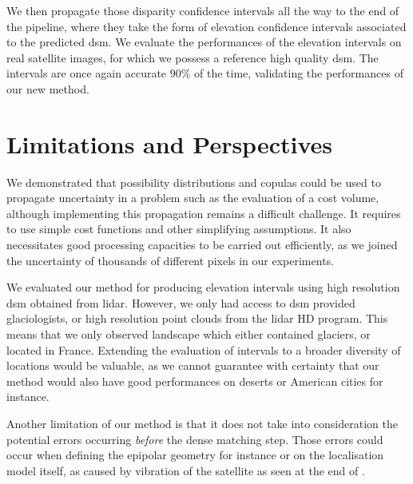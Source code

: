 We then propagate those disparity confidence intervals all the way to the end of the pipeline, where they take the form of elevation confidence intervals associated to the predicted \acrshort{dsm}. We evaluate the performances of the elevation intervals on real satellite images, for which we possess a reference high quality \acrshort{dsm}. The intervals are once again accurate $90\%$ of the time, validating the performances of our new method.

\section*{Limitations and Perspectives}
We demonstrated that possibility distributions and copulas could be used to propagate uncertainty in a problem such as the evaluation of a cost volume, although implementing this propagation remains a difficult challenge. It requires to use simple cost functions and other simplifying assumptions. It also necessitates good processing capacities to be carried out efficiently, as we joined the uncertainty of thousands of different pixels in our experiments.

We evaluated our method for producing elevation intervals using high resolution \acrshort{dsm} obtained from \acrshort{lidar}. However, we only had access to \acrshort{dsm} provided glaciologists, or high resolution point clouds from the \acrshort{lidar} HD program. This means that we only observed landscape which either contained glaciers, or located in France. Extending the evaluation of intervals to a broader diversity of locations would be valuable, as we cannot guarantee with certainty that our method would also have good performances on deserts or American cities for instance. 

Another limitation of our method is that it does not take into consideration the potential errors occurring \textit{before} the dense matching step. Those errors could occur when defining the epipolar geometry for instance or on the localisation model itself, as caused by vibration of the satellite as seen at the end of . 

